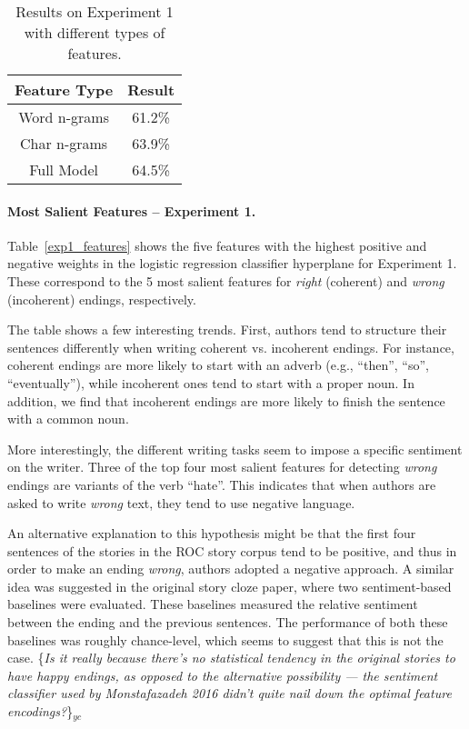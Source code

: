 \documentclass[11pt,a4paper]{article}
\newcommand{\tabref}[1]{Table~\ref{#1}}
\newcommand{\yc}[1]{{\color{bblue}\{\textit{#1}\}$_{yc}$}}
\begin{document}
\begin{table}[!t]
\begin{center}
\begin{tabular}{|c|c|} \hline
{\bf Feature Type} & {\bf Result}\\ \hline
Word n-grams & 61.2\% \\ \hline
Char n-grams & 63.9\% \\ \hline
Full Model & 64.5\% \\ \hline

\end{tabular}
\end{center}
\caption{\label{subgroups}
Results on Experiment 1 with different types of features.
}
\end{table}

\paragraph{Most Salient Features -- Experiment 1.}
\tabref{exp1_features} shows the five features with the highest positive and negative weights in the logistic regression classifier hyperplane for Experiment 1. 
These correspond to the 5 most salient features for {\it right} (coherent) and {\it wrong} (incoherent) endings, respectively.

The table shows a few interesting trends. 
First, authors tend to structure their sentences differently when writing {coherent}  vs. {incoherent} endings.
For instance, {coherent} endings are more likely to start with an adverb (e.g., ``then'', ``so'', ``eventually''), while {incoherent} ones tend to start with a proper noun.
In addition, we find that {incoherent} endings are more likely to finish the sentence with a common noun. 

More interestingly, the different writing tasks seem to impose a specific sentiment on the writer. 
Three of the top four most salient features for detecting {\it wrong} endings are variants of the verb ``hate''.
This indicates that when authors are asked to write {\it wrong} text, they tend to use negative language.

An alternative explanation to this hypothesis might be that the first four sentences of the stories in the ROC story corpus tend to be positive, and thus in order to make an ending {\it wrong}, authors adopted a negative approach. 
A similar idea was suggested in the original story cloze paper, where two sentiment-based baselines were evaluated. 
These baselines measured the relative sentiment between the ending and the previous sentences.
The performance of both these baselines was roughly chance-level, which seems to suggest that this is not the case.
\yc{Is it really because there's no statistical tendency in the original stories to have happy endings, as opposed to the alternative possibility --- the sentiment classifier used by Monstafazadeh 2016 didn't quite nail down the optimal feature encodings?} 
\end{document}
